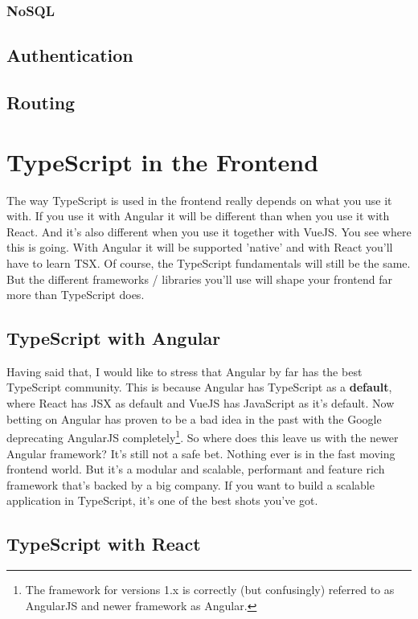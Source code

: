 \documentclass[12pt,a4paper]{report}
\begin{document}
\subsection{NoSQL}

\section{Authentication}

\section{Routing}


\chapter{TypeScript in the Frontend}

The way TypeScript is used in the frontend really depends on what you use it with. If you use it with Angular it will be different than when you use it with React. And it's also different when you use it together with VueJS. You see where this is going. With Angular it will be supported 'native' and with React you'll have to learn TSX. Of course, the TypeScript fundamentals will still be the same. But the different frameworks / libraries you'll use will shape your frontend far more than TypeScript does.

\section{TypeScript with Angular}

Having said that, I would like to stress that Angular by far has the best TypeScript community. This is because Angular has TypeScript as a \textbf{default}, where React has JSX as default and VueJS has JavaScript as it's default. Now betting on Angular has proven to be a bad idea in the past with the Google deprecating AngularJS completely\footnote{The framework for versions 1.x is correctly (but confusingly) referred to as AngularJS and newer framework as Angular.}. So where does this leave us with the newer Angular framework? It's still not a safe bet. Nothing ever is in the fast moving frontend world. But it's  a modular and scalable, performant and feature rich framework that's backed by a big company. If you want to build a scalable application in TypeScript, it's one of the best shots you've got.


\section{TypeScript with React}
\end{document}
